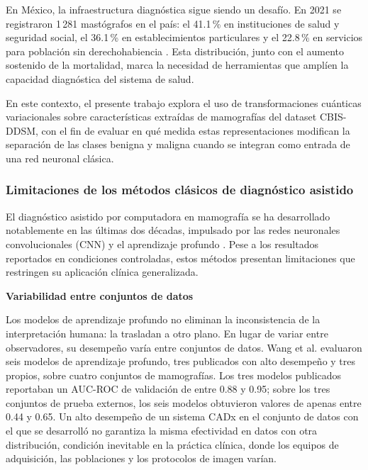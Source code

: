 En México, la infraestructura diagnóstica sigue siendo un desafío. En 2021 se registraron 1\,281
mastógrafos en el país: el 41.1\,\% en instituciones de salud y seguridad social, el 36.1\,\% en
establecimientos particulares y el 22.8\,\% en servicios para población sin derechohabiencia
\cite{INEGI2023}. Esta distribución, junto con el aumento sostenido de la
mortalidad, marca la necesidad de herramientas que amplíen la capacidad diagnóstica del sistema de salud.

En este contexto, el presente trabajo explora el uso de transformaciones cuánticas variacionales
sobre características extraídas de mamografías del dataset CBIS-DDSM, con el fin de evaluar en qué
medida estas representaciones modifican la separación de las clases benigna y maligna cuando se
integran como entrada de una red neuronal clásica.

\subsubsection{Limitaciones de los métodos clásicos de diagnóstico asistido}

El diagnóstico asistido por computadora en mamografía se ha desarrollado notablemente en las últimas
dos décadas, impulsado por las redes neuronales convolucionales (CNN) y el aprendizaje profundo
\cite{TandFOnline2021}. Pese a los resultados reportados en condiciones controladas, estos métodos
presentan limitaciones que restringen su aplicación clínica generalizada.

\textbf{Variabilidad entre conjuntos de datos}

Los modelos de aprendizaje profundo no eliminan la inconsistencia de la interpretación humana: la
trasladan a otro plano. En lugar de variar entre observadores, su desempeño varía entre conjuntos de
datos. Wang et al. \cite{Wang2020DeepLearning} evaluaron seis modelos de aprendizaje profundo, tres
publicados con alto desempeño y tres propios, sobre cuatro conjuntos de mamografías. Los tres modelos
publicados reportaban un AUC-ROC de validación de entre 0.88 y 0.95; sobre los tres conjuntos de
prueba externos, los seis modelos obtuvieron valores de apenas entre 0.44 y 0.65. Un alto desempeño de un sistema CADx en el conjunto de datos con el que se desarrolló no garantiza la
misma efectividad en datos con otra distribución, condición inevitable en la práctica clínica, donde los equipos de adquisición, las
poblaciones y los protocolos de imagen varían.

